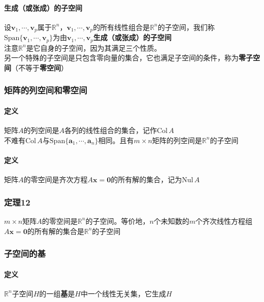 \documentclass{article}
\newcommand{\ve}{\boldsymbol}
\newcommand{\spans}{\text{Span}}
\begin{document}
\begin{CJK}{UTF8}{gkai}
\paragraph{生成（或张成）的子空间\\}
设$\ve{v}_1,\cdots,\ve{v}_p$属于$\mathbb{R}^n$，$\ve{v}_1,\cdots,\ve{v}_p$的所有线性组合是$\mathbb{R}^n$的子空间，我们称$\spans\{\ve{v}_1,\cdots,\ve{v}_p\}$为由$\ve{v}_1,\cdots,\ve{v}_p$\textbf{生成（或张成）的子空间}\\

注意$\mathbb{R}^n$是它自身的子空间，因为其满足三个性质。\\
另一个特殊的子空间是只包含零向量的集合，它也满足子空间的条件，称为\textbf{零子空间}（不等于\textbf{零空间}）\\

\subsubsection{矩阵的列空间和零空间}
\paragraph{定义\\}
矩阵$A$的列空间是$A$各列的线性组合的集合，记作$\text{Col}\, A$\\

不难有$\text{Col} \,A$与$\spans\{\ve{a}_1,\cdots,\ve{a}_n\}$相同。且有$m\times n$矩阵的列空间是$\mathbb{R}^n$的子空间\\
\paragraph{定义\\}
矩阵$A$的零空间是齐次方程$A\ve{x}=\ve{0}$的所有解的集合，记为$\text{Nul}\, A$\\
\subsubsection{定理12}
$m\times n$矩阵$A$的零空间是$\mathbb{R}^n$的子空间。等价地，$n$个未知数的$m$个齐次线性方程组$A\ve{x}=\ve{0}$的所有解的集合是$\mathbb{R}^n$的子空间\\
\subsubsection{子空间的基}
\paragraph{定义\\}
$\mathbb{R}^n$子空间$H$的一组\textbf{基}是$H$中一个线性无关集，它生成$H$\\

\end{CJK}
\end{document}
